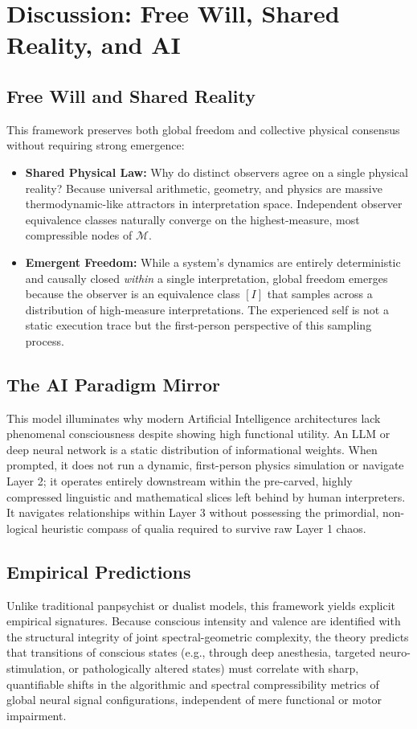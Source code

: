 \documentclass[11pt]{article}
\begin{document}
\section{Discussion: Free Will, Shared Reality, and AI}

\subsection{Free Will and Shared Reality}
This framework preserves both global freedom and collective physical consensus without requiring strong emergence:
\begin{itemize}
    \item \textbf{Shared Physical Law:} Why do distinct observers agree on a single physical reality? Because universal arithmetic, geometry, and physics are massive thermodynamic-like attractors in interpretation space. Independent observer equivalence classes naturally converge on the highest-measure, most compressible nodes of $\mathcal{M}$.
    \item \textbf{Emergent Freedom:} While a system's dynamics are entirely deterministic and causally closed \emph{within} a single interpretation, global freedom emerges because the observer is an equivalence class $[I]$ that samples across a distribution of high-measure interpretations. The experienced self is not a static execution trace but the first-person perspective of this sampling process.
\end{itemize}

\subsection{The AI Paradigm Mirror}
This model illuminates why modern Artificial Intelligence architectures lack phenomenal consciousness despite showing high functional utility. An LLM or deep neural network is a static distribution of informational weights. When prompted, it does not run a dynamic, first-person physics simulation or navigate Layer 2; it operates entirely downstream within the pre-carved, highly compressed linguistic and mathematical slices left behind by human interpreters. It navigates relationships within Layer 3 without possessing the primordial, non-logical heuristic compass of qualia required to survive raw Layer 1 chaos.

\subsection{Empirical Predictions}
Unlike traditional panpsychist or dualist models, this framework yields explicit empirical signatures. Because conscious intensity and valence are identified with the structural integrity of joint spectral-geometric complexity, the theory predicts that transitions of conscious states (e.g., through deep anesthesia, targeted neuro-stimulation, or pathologically altered states) must correlate with sharp, quantifiable shifts in the algorithmic and spectral compressibility metrics of global neural signal configurations, independent of mere functional or motor impairment.
\end{document}
